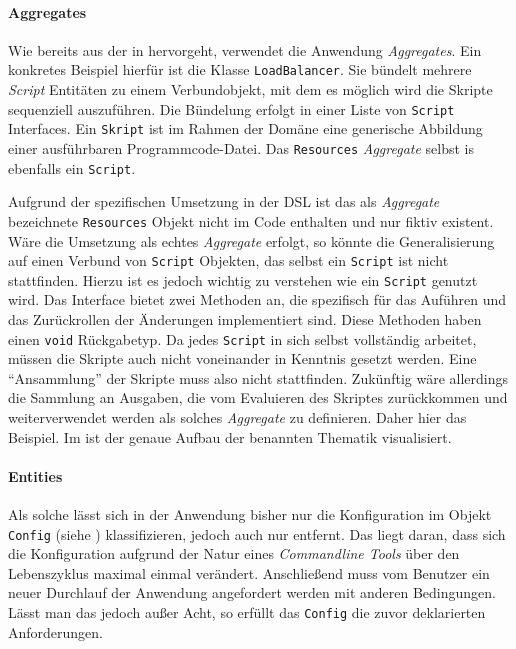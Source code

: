 \paragraph{Aggregates} 

Wie bereits aus der in  hervorgeht, verwendet die Anwendung \emph{Aggregates}.
Ein konkretes Beispiel hierfür ist die Klasse \texttt{LoadBalancer}.
Sie bündelt mehrere \emph{Script} Entitäten zu einem Verbundobjekt, mit dem es möglich wird die Skripte sequenziell auszuführen.
Die Bündelung erfolgt in einer Liste von \texttt{Script} Interfaces.
Ein \texttt{Skript} ist im Rahmen der Domäne eine generische Abbildung einer ausführbaren Programmcode-Datei.
Das \texttt{Resources} \emph{Aggregate} selbst is ebenfalls ein \texttt{Script}.

Aufgrund der spezifischen Umsetzung in der DSL ist das als \emph{Aggregate} bezeichnete \texttt{Resources} Objekt nicht im Code enthalten und nur fiktiv existent. 
Wäre die Umsetzung als echtes \emph{Aggregate} erfolgt, so könnte die Generalisierung auf einen Verbund von \texttt{Script} Objekten, das selbst ein \texttt{Script} ist nicht stattfinden.
Hierzu ist es jedoch wichtig zu verstehen wie ein \texttt{Script} genutzt wird.
Das Interface bietet zwei Methoden an, die spezifisch für das Auführen und das Zurückrollen der Änderungen implementiert sind.
Diese Methoden haben einen \texttt{void} Rückgabetyp.
Da jedes \texttt{Script} in sich selbst vollständig arbeitet, müssen die Skripte auch nicht voneinander in Kenntnis gesetzt werden.
Eine \enquote{Ansammlung} der Skripte muss also nicht stattfinden. 
Zukünftig wäre allerdings die Sammlung an Ausgaben, die vom Evaluieren des Skriptes zurückkommen und weiterverwendet werden als solches \emph{Aggregate} zu definieren.
Daher hier das Beispiel.
Im  ist der genaue Aufbau der benannten Thematik visualisiert.

\bgroup

    \label{lst:ressources_builder}
\egroup

\paragraph{Entities} 

Als solche lässt sich in der Anwendung bisher nur die Konfiguration im Objekt \texttt{Config} (siehe ) klassifizieren, jedoch auch nur entfernt.
Das liegt daran, dass sich die Konfiguration aufgrund der Natur eines \emph{Commandline Tools} über den Lebenszyklus maximal einmal verändert.
Anschließend muss vom Benutzer ein neuer Durchlauf der Anwendung angefordert werden mit anderen Bedingungen.
Lässt man das jedoch außer Acht, so erfüllt das \texttt{Config} die zuvor deklarierten Anforderungen.

